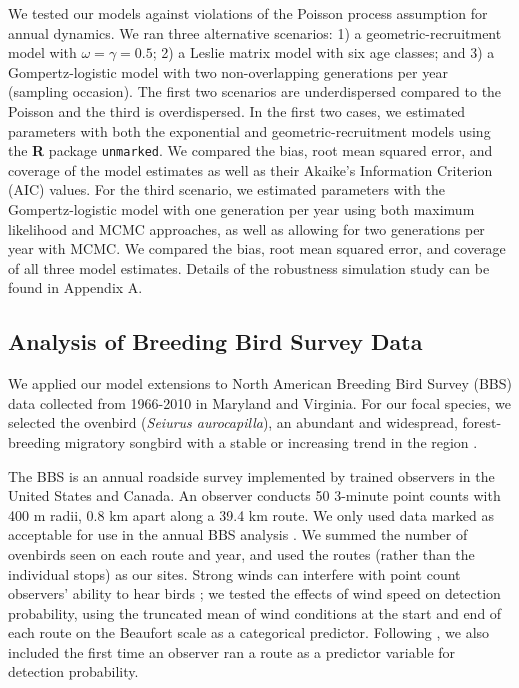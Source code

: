 \documentclass[12pt,english]{article}
\begin{document}
\begin{spacing}{1.9}
\begin{flushleft}
We tested our models against violations of the Poisson process assumption for
annual dynamics.  We ran three alternative scenarios: 1) a geometric-recruitment model with
$\omega = \gamma = 0.5$; 2) a Leslie matrix model with six age classes; and 3) 
a Gompertz-logistic model with two non-overlapping generations per year (sampling occasion).   
The first two scenarios are underdispersed compared to the Poisson and the third is overdispersed.
In the first two cases, we estimated parameters with both the exponential and geometric-recruitment
models using the \textbf{R} package \texttt{unmarked}.  We compared the bias,
root mean squared error, and coverage of the model estimates as well as their Akaike's Information
Criterion (AIC) values.
For the third scenario, we estimated parameters with the Gompertz-logistic model with 
one generation per year using both maximum likelihood and MCMC approaches, as well
as allowing for two generations per year with MCMC.  We compared the bias, root mean
squared error, and coverage of all three model estimates.  Details of the robustness simulation
study can be found in Appendix A.

\subsection*{Analysis of Breeding Bird Survey Data}

We applied our model extensions to North American Breeding Bird Survey
(BBS) data collected from 1966-2010 in 
Maryland and Virginia. For our focal species, we selected the
ovenbird (\textit{Seiurus aurocapilla}), an abundant and widespread,
forest- breeding migratory songbird with a stable or increasing trend
in the region \citep{porneluzi_etal:2011}. 

The BBS is an annual roadside survey implemented by trained
observers in the United States and Canada. An observer conducts 50
3-minute point counts with 400 m radii, 0.8 km apart 
along a
39.4 km route. We only used data marked as acceptable for use in the annual BBS
analysis \citep{sauer_etal:1994auk}.  We summed the number of ovenbirds
seen on each route and year, and used the routes (rather
than the individual stops) as our sites.
Strong winds can interfere with point count observers' ability
to hear birds \citep{simons_etal:2007}; we tested the effects of wind
speed on detection probability, using the truncated mean of wind conditions at the start and end of
each route on the Beaufort scale as a categorical predictor. 
Following \citet{link_sauer:2002},
we also included the first time an observer ran a route as a predictor variable for detection
probability.
 

\end{flushleft}
\end{spacing}
\end{document}
